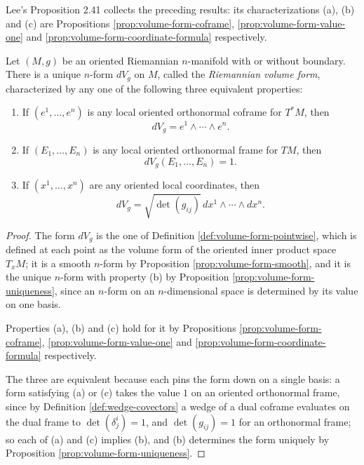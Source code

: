 Lee's Proposition 2.41 collects the preceding results: its characterizations (a), (b) and (c) are
Propositions \ref{prop:volume-form-coframe}, \ref{prop:volume-form-value-one} and
\ref{prop:volume-form-coordinate-formula} respectively.

\begin{proposition}
\label{prop:riemannian-volume-form}
\leanok
{}
Let $(M, g)$ be an oriented Riemannian $n$-manifold with or without boundary. There is a unique $n$-form $dV_g$ on
$M$, called the \emph{Riemannian volume form}, characterized by any one of the following
three equivalent properties:

\begin{enumerate}[label=(\alph*)]
\item If $(e^1, \ldots, e^n)$ is any local oriented orthonormal coframe for $T^* M$, then
$$dV_g = e^1 \wedge \cdots \wedge e^n.$$

\item If $(E_1, \ldots, E_n)$ is any local oriented orthonormal frame for $TM$, then
$$dV_g(E_1, \ldots, E_n) = 1.$$

\item If $(x^1, \ldots, x^n)$ are any oriented local coordinates, then
$$dV_g = \sqrt{\det(g_{ij})} \, dx^1 \wedge \cdots \wedge dx^n.$$
\end{enumerate}
\end{proposition}

\begin{proof}
\leanok
{}
The form $dV_g$ is the one of Definition \ref{def:volume-form-pointwise}, which is defined at each
point as the volume form of the oriented inner product space $T_x M$; it is a smooth $n$-form by
Proposition \ref{prop:volume-form-smooth}, and it is the unique $n$-form with property (b) by
Proposition \ref{prop:volume-form-uniqueness}, since an $n$-form on an $n$-dimensional space is
determined by its value on one basis.

Properties (a), (b) and (c) hold for it by Propositions \ref{prop:volume-form-coframe},
\ref{prop:volume-form-value-one} and \ref{prop:volume-form-coordinate-formula} respectively.

The three are equivalent because each pins the form down on a single basis: a form satisfying (a)
or (c) takes the value $1$ on an oriented orthonormal frame, since by Definition
\ref{def:wedge-covectors} a wedge of a dual coframe evaluates on the dual frame to
$\det(\delta^i_j) = 1$, and $\det(g_{ij}) = 1$ for an orthonormal frame; so each of (a) and (c)
implies (b), and (b) determines the form uniquely by Proposition
\ref{prop:volume-form-uniqueness}.
\end{proof}

